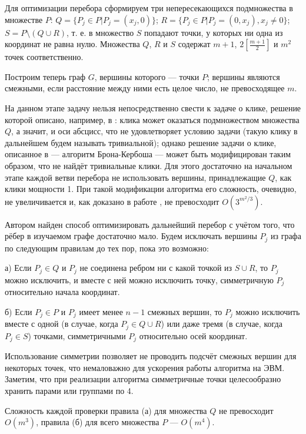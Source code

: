 \documentclass{article}
\begin{document}
Для оптимизации перебора сформируем три непересекающихся подмножества в множестве $P$:
$Q = \{P_j \in P | P_j = (x_j, 0)\}$;
$R = \{P_j \in P | P_j = (0, x_j), x_j \neq 0\}$;
$S = P \setminus \left( Q \cup R\right)$,
т. е. в множество $S$ попадают точки, у которых ни одна из координат не равна нулю.
Множества $Q$, $R$ и $S$ содержат $m+1$, $2\left\lbrack\frac{m+1}{2}\right\rbrack$ и $m^2$ точек соответственно.

Построим теперь граф $G$, вершины которого --- точки $P$;
вершины являются смежными, если расстояние между ними есть целое число, не превосходящее $m$.

На данном этапе задачу нельзя непосредственно свести к задаче о клике, решение которой описано, например, в \cite{BronKerbosh}:
клика может оказаться подмножеством множества $Q$, а значит, и оси абсцисс, что не удовлетворяет условию задачи (такую клику в дальнейшем будем называть тривиальной);
однако решение задачи о клике, описанное в \cite{BronKerbosh} --- алгоритм Брона-Кербоша --- может быть модифицирован таким образом, что не найдёт тривиальные клики.
Для этого достаточно на начальном этапе каждой ветви перебора не использовать вершины, принадлежащие $Q$, как клики мощности 1.
При такой модификации алгоритма его сложность, очевидно, не увеличивается и, как доказано в работе \cite{Tomita}, не превосходит $O(3^{m^2/3})$.


Автором найден способ оптимизировать дальнейший перебор с учётом того, что рёбер в изучаемом графе достаточно мало.
Будем исключать вершины $P_j$ из графа по следующим правилам до тех пор, пока это возможно:

а) Если $P_j \in Q$ и $P_j$ не соединена ребром ни с какой точкой из $S \cup R$, то $P_j$ можно исключить, и вместе с ней можно исключить точку, симметричную $P_j$ относительно начала координат.

б) Если $P_j \in P$ и $P_j$ имеет менее $n-1$ смежных вершин, то $P_j$ можно исключить вместе с одной (в случае, когда $P_j \in Q \cup R$) или даже тремя (в случае, когда $P_j \in S$) точками, симметричными $P_j$ относительно осей координат.

Использование симметрии позволяет не проводить подсчёт смежных вершин для некоторых точек, что немаловажно для ускорения работы алгоритма на ЭВМ.
Заметим, что при реализации алгоритма симметричные точки целесообразно хранить парами или группами по 4.

Сложность каждой проверки правила (а) для множества $Q$ не превосходит $O(m^3)$, правила (б) для всего множества $P$ --- $O(m^4)$.
\end{document}
